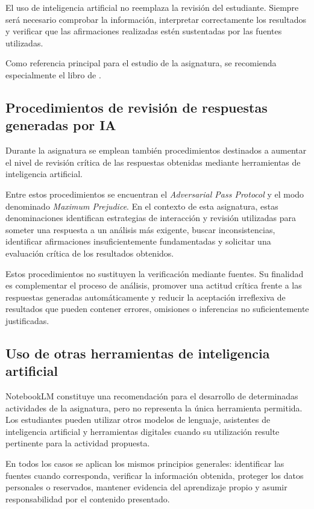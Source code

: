 \documentclass[12pt,a4paper]{article}
\begin{document}
El uso de inteligencia artificial no reemplaza la revisión del estudiante. Siempre será necesario comprobar la información, interpretar correctamente los resultados y verificar que las afirmaciones realizadas estén sustentadas por las fuentes utilizadas.

Como referencia principal para el estudio de la asignatura, se recomienda especialmente el libro de \textcite{vanhorne2010fundamentos}.

\subsection{Procedimientos de revisión de respuestas generadas por IA}

Durante la asignatura se emplean también procedimientos destinados a aumentar el nivel de revisión crítica de las respuestas obtenidas mediante herramientas de inteligencia artificial.

Entre estos procedimientos se encuentran el \textit{Adversarial Pass Protocol} y el modo denominado \textit{Maximum Prejudice}. En el contexto de esta asignatura, estas denominaciones identifican estrategias de interacción y revisión utilizadas para someter una respuesta a un análisis más exigente, buscar inconsistencias, identificar afirmaciones insuficientemente fundamentadas y solicitar una evaluación crítica de los resultados obtenidos.

Estos procedimientos no sustituyen la verificación mediante fuentes. Su finalidad es complementar el proceso de análisis, promover una actitud crítica frente a las respuestas generadas automáticamente y reducir la aceptación irreflexiva de resultados que pueden contener errores, omisiones o inferencias no suficientemente justificadas.

\subsection{Uso de otras herramientas de inteligencia artificial}

NotebookLM constituye una recomendación para el desarrollo de determinadas actividades de la asignatura, pero no representa la única herramienta permitida. Los estudiantes pueden utilizar otros modelos de lenguaje, asistentes de inteligencia artificial y herramientas digitales cuando su utilización resulte pertinente para la actividad propuesta.

En todos los casos se aplican los mismos principios generales: identificar las fuentes cuando corresponda, verificar la información obtenida, proteger los datos personales o reservados, mantener evidencia del aprendizaje propio y asumir responsabilidad por el contenido presentado.
\end{document}
